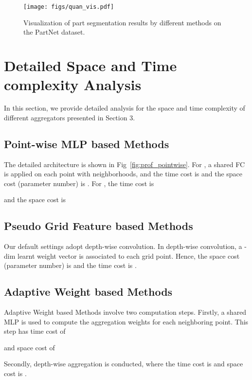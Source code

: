 \documentclass[runningheads]{llncs}
\begin{document}
\begin{figure}[t]
	\begin{center}
		\texttt{[image: figs/quan\_vis.pdf]}
	\end{center}
	\vspace{-2em}
	\caption{Visualization of part segmentation results by different methods on the PartNet dataset.}
	\vspace{-1em}
	\label{fig:quan_vis}
\end{figure}

\section{Detailed Space and Time complexity Analysis}
In this section, we provide detailed analysis for the space and time complexity of different aggregators presented in Section 3.

\subsection{Point-wise MLP based Methods} The detailed architecture is shown in Fig~\ref{fig:prof_pointwise}. For , a shared FC is applied on each point with  neighborhoods, and the time cost is  and the space cost (parameter number) is . For , the time cost is
\begin{small}
	
\end{small}
and the space cost is
\begin{small}
	
\end{small}

\subsection{Pseudo Grid Feature based Methods}
Our default settings adopt depth-wise convolution. In depth-wise convolution, a -dim learnt weight vector is associated to each grid point. Hence, the space cost (parameter number) is  and the time cost is .

\subsection{Adaptive Weight based Methods}
Adaptive Weight based Methods involve two computation steps. Firstly, a shared MLP is used to compute the aggregation weights for each neighboring point. This step has time cost of
\begin{small}
	
\end{small}
and space cost of
\begin{small}
	
\end{small}
Secondly, depth-wise aggregation is conducted, where the time cost is  and space cost is .
\end{document}
